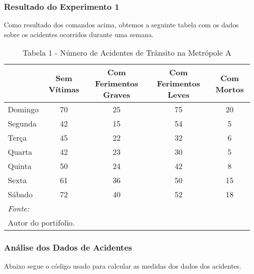 \documentclass[portuguese,]{article}
\begin{document}
\subsubsection{Resultado do Experimento
1}\label{resultado-do-experimento-1}

Como resultado dos comandos acima, obtemos a seguinte tabela com os
dados sobre os acidentes ocorridos durante uma semana.

\begin{table}[t]

\caption{\label{tab:tabela acidentes}Tabela 1 - Número de Acidentes de Trânsito na Metrópole A}
\centering
\begin{tabular}{l|c|c|c|c}
\hline
  & Sem Vítimas & Com Ferimentos Graves & Com Ferimentos Leves & Com Mortos\\
\hline
Domingo & 70 & 25 & 75 & 20\\
\hline
Segunda & 42 & 15 & 54 & 5\\
\hline
Terça & 45 & 22 & 32 & 6\\
\hline
Quarta & 42 & 23 & 30 & 5\\
\hline
Quinta & 50 & 24 & 42 & 8\\
\hline
Sexta & 61 & 36 & 50 & 15\\
\hline
Sábado & 72 & 40 & 52 & 18\\
\hline
\multicolumn{5}{l}{\textit{Fonte:}}\\
\multicolumn{5}{l}{Autor do portifolio.}\\
\end{tabular}
\end{table}

\subsubsection{Análise dos Dados de
Acidentes}\label{analise-dos-dados-de-acidentes}

Abaixo segue o código usado para calcular as medidas dos dados dos
acidentes.
\end{document}
